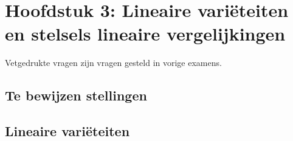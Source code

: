 \documentclass[12pt]{article}
\begin{document}
\date{}    
\maketitle
    \section*{Hoofdstuk 3: Lineaire variëteiten en stelsels lineaire vergelijkingen}
    Vetgedrukte vragen zijn vragen gesteld in vorige examens.
    \setcounter{section}{3}
    \subsection*{Te bewijzen stellingen}
    \subsection{Lineaire variëteiten}
\end{document}
